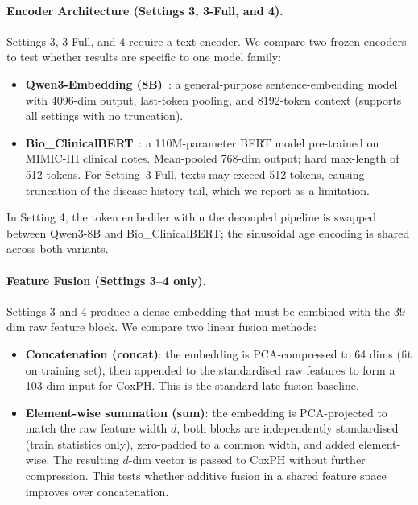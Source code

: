 \paragraph{Encoder Architecture (Settings 3, 3-Full, and 4).}
Settings 3, 3-Full, and 4 require a text encoder.
We compare two frozen encoders to test whether results are specific to one
model family:
\begin{itemize}
  \item \textbf{Qwen3-Embedding (8B)}~\cite{qwen3}: a general-purpose
        sentence-embedding model with 4096-dim output,
        last-token pooling, and 8192-token context (supports all settings
        with no truncation).
  \item \textbf{Bio\_ClinicalBERT}~\cite{bioclinicalbert}: a 110M-parameter
        BERT model pre-trained on MIMIC-III clinical notes.
        Mean-pooled 768-dim output; hard max-length of 512 tokens.
        For Setting~3-Full, texts may exceed 512 tokens,
        causing truncation of the disease-history tail, which we report as a
        limitation.
\end{itemize}
In Setting 4, the token embedder within the decoupled pipeline is swapped
between Qwen3-8B and Bio\_ClinicalBERT; the sinusoidal age encoding is
shared across both variants.

\paragraph{Feature Fusion (Settings 3--4 only).}
Settings 3 and 4 produce a dense embedding that must be combined with the
39-dim raw feature block.
We compare two linear fusion methods:
\begin{itemize}
  \item \textbf{Concatenation (concat)}: the embedding is PCA-compressed
        to 64 dims (fit on training set), then appended to the standardised
        raw features to form a 103-dim input for CoxPH.
        This is the standard late-fusion baseline.
  \item \textbf{Element-wise summation (sum)}: the embedding is
        PCA-projected to match the raw feature width $d$, both blocks are
        independently standardised (train statistics only), zero-padded to a
        common width, and added element-wise.
        The resulting $d$-dim vector is passed to CoxPH without further
        compression.
        This tests whether additive fusion in a shared feature space improves
        over concatenation.
\end{itemize}


